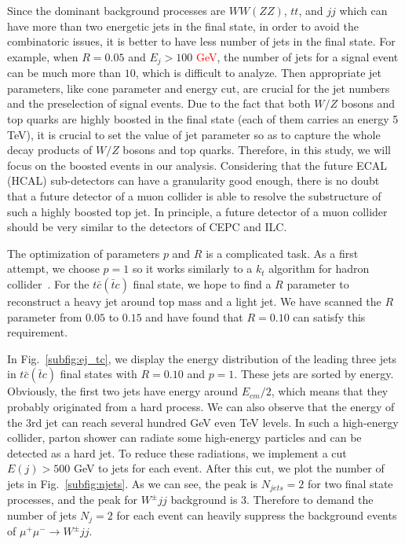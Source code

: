 \documentclass[a4paper,11pt]{article}
\begin{document}
Since the dominant background processes are $WW (ZZ)$, $tt$, 
and $jj$ which can have more than two energetic jets in the final state, 
in order to avoid the combinatoric issues, it is better to have less number of jets in the final state. 
For example, when $R=0.05$ and $E_j>100$ \textcolor{red}{GeV},
the number of jets for a signal event can be much more than $10$, which is difficult to analyze. 
Then appropriate jet parameters, like cone parameter and energy cut, 
are crucial for the jet numbers and the preselection of signal events. 
Due to the fact that both $W/Z$ bosons and top quarks are highly boosted in the final state 
(each of them carries an energy 5 TeV), 
it is crucial to set the value of jet parameter so as to capture the whole decay products of $W/Z$ bosons and top quarks. Therefore, in this study, we will focus on the boosted events in our analysis. Considering that the future ECAL (HCAL) sub-detectors can have a granularity good enough,  there is no doubt that a future detector of a muon collider is able to resolve the substructure of such a highly boosted top jet. In principle, a future detector of a muon collider should be very similar to the detectors of CEPC and ILC.

The optimization of parameters $p$ and $R$ is a complicated task.
As a first attempt, we choose $p=1$ so it works similarly to a $k_t$ algorithm for hadron collider~\cite{Catani:1993hr,Ellis:1993tq}. 
For the $t\bar{c}(\bar{t}c)$ final state, we hope to find a $R$ parameter to reconstruct a heavy jet around top mass and a light jet.
We have scanned the $R$ parameter from $0.05$ to $0.15$ and have found that $R=0.10$ can satisfy this requirement. 

In Fig.~\ref{subfig:ej_tc}, we display the energy distribution of the leading three jets in $t\bar{c}(\bar{t}c)$ final states with $R=0.10$ and $p=1$. 
These jets are sorted by energy.  Obviously, the first two jets have energy around $E_{cm}/2$, 
which means that they probably originated from a hard process.
We can also observe that the energy of the 3rd jet can reach several hundred GeV even TeV levels.
In such a high-energy collider, parton shower can radiate some high-energy particles and can be detected as a hard jet. To reduce these radiations, we implement a cut $E(j)>500$ GeV to jets for each event. 
After this cut, we plot the number of jets in Fig.~\ref{subfig:njets}. 
As we can see, the peak is $N_{jets}=2$ for two final state processes, and the peak for $W^{\pm}jj$ background is 3. 
Therefore to demand the number of jets $N_j=2$ for each event can heavily suppress the background events of $\mu^+ \mu^- \to W^{\pm}jj$.
\end{document}

